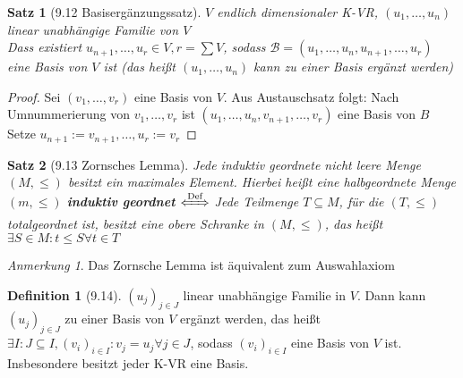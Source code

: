 \documentclass[a4paper]{scrartcl}
\DeclareMathOperator{\Exists}{\exists}
\DeclareMathOperator{\Forall}{\forall}
\theoremstyle{definition}
\newtheorem{defn}{Definition}
\theoremstyle{plain}
\newtheorem{thm}{Satz}
\theoremstyle{plain}
\theoremstyle{remark}
\theoremstyle{remark}
\newtheorem{note}{Anmerkung}
\theoremstyle{remark}
\theoremstyle{remark}
\theoremstyle{remark}
\begin{document}
\begin{thm}[9.12 Basisergänzungssatz]
$V$ endlich dimensionaler K-VR, $(u_1, \ldots, u_n)$ linear unabhängige Familie von $V$ \\
  Dass existiert $u_{n + 1}, \ldots, u_r \in V, r = \sum V$, sodass $\mathcal{B} = (u_1, \ldots, u_n, u_{n + 1}, \ldots, u_r)$ eine Basis von $V$ ist (das heißt $(u_1, \ldots, u_n)$ kann zu einer Basis ergänzt werden)
\end{thm}
\begin{proof}
Sei $(v_1, \ldots, v_r)$ eine Basis von $V$. Aus Austauschsatz folgt: Nach Umnummerierung von $v_1, \ldots, v_r$ ist $(u_1, \ldots, u_n,  v_{n + 1}, \ldots, v_r)$ eine Basis von $B$ Setze $u_{n + 1} := v_{n + 1}, \ldots, u_r := v_r$
\end{proof}
\begin{thm}[9.13 Zornsches Lemma]
Jede induktiv geordnete nicht leere Menge $(M, \leq)$ besitzt ein maximales Element.
Hierbei heißt eine halbgeordnete Menge $(m, \leq)$ \textbf{induktiv geordnet} $\xLeftrightarrow{\text{Def}}$ Jede Teilmenge $T\subseteq M$, für die $(T, \leq)$ totalgeordnet ist,
besitzt eine obere Schranke in $(M, \leq)$, das heißt $\Exists S\in M: t\leq S \Forall t\in T$
\end{thm}
\begin{note}
Das Zornsche Lemma ist äquivalent zum Auswahlaxiom
\end{note}
\begin{defn}[9.14]
$(u_j)_{j\in J}$ linear unabhängige Familie in $V$. Dann kann $(u_j)_{j \in J}$ zu einer
Basis von $V$ ergänzt werden, das heißt $\Exists I: J\subseteq I, (v_i)_{i\in I}: v_j = u_j \Forall j\in J$, sodass $(v_i)_{i\in I}$  eine Basis von $V$ ist.
Insbesondere besitzt jeder K-VR eine Basis.
\end{defn}
\end{document}

